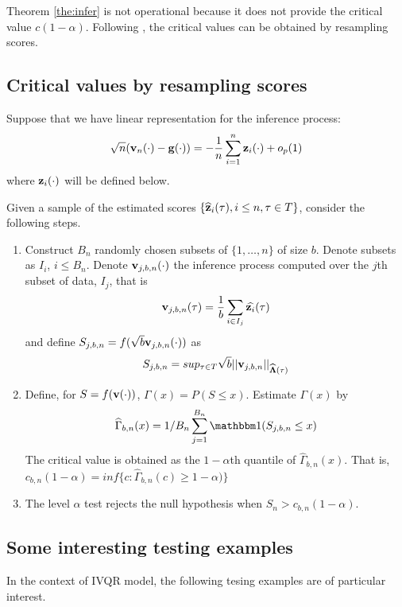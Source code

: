 Theorem \ref{the:infer} is not operational because it does not provide the
critical value $c(1 - \alpha)$. Following \cite{Chernozhukov2006}, the critical
values can be obtained by resampling scores.

\subsection{Critical values by resampling scores}
Suppose that we have linear representation for the inference process:
\begin{align}
  \sqrt{n}(\mathbf{v}_n(\cdot) - \mathbf{g}(\cdot)) = 
  -\frac{1}{n} \sum_{i=1}^n \mathbf{z}_i(\cdot) + o_p(1)
\end{align}
where $\mathbf{z}_i(\cdot)$ will be defined below.

Given a sample of the estimated scores $\{\widehat{\mathbf{z}}_i(\tau), i \leq n, \tau \in
T\}$, consider the following steps.

\begin{enumerate}
  \item Construct $B_n$ randomly chosen subsets of $\{1, \ldots, n\}$ of size
    $b$. Denote subsets as $I_i$, $i \leq B_n$. Denote $\mathbf{v}_{j, b, n}(\cdot)$
    the inference process computed over the $j$th subset of data, $I_j$, that is
    $$
    \mathbf{v}_{j, b, n}(\tau) = \frac{1}{b} \sum_{i \in I_j} \widehat{\mathbf{z}_i}(\tau)
    $$
    and define $S_{j, b, n} = f(\sqrt{b} \mathbf{v}_{j, b, n}(\cdot))$ as
    $$
    	S_{j, b, n} = sup_{\tau \in T} \sqrt{b} || \mathbf{v}_{j, b, n}
	||_{\widehat{\boldsymbol{\Lambda}}(\tau)}
    $$

  \item Define, for $S = f(\mathbf{v}(\cdot))$, $\Gamma(x) = P (S \leq x)$. Estimate
    $\Gamma(x)$ by 
    $$
    \hat{\Gamma}_{b, n}(x) = 1/B_n \sum_{j=1}^{B_n} \I(S_{j, b, n} \leq x)
    $$
    The critical value is obtained as the $ 1 - \alpha$th quantile of
    $\hat{\Gamma}_{b, n}(x)$. That is, $c_{b, n}(1 - \alpha) = inf\{c:
      \hat{\Gamma}_{b, n}(c) \geq  1 - \alpha)\}$

  \item  The level $\alpha$ test rejects the null hypothesis when $S_n > c_{b,
    n}(1 - \alpha)$.
    
\end{enumerate}

\subsection{Some interesting testing examples}
In the context of IVQR model, the following tesing examples are of particular
interest.

